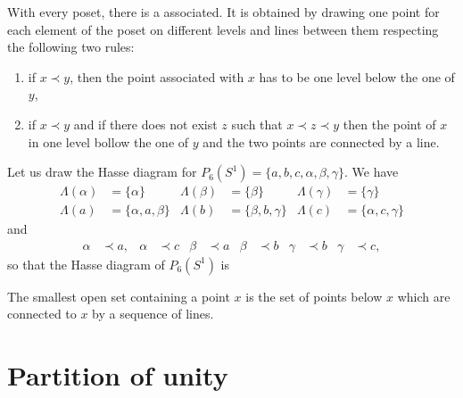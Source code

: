 With every poset, there is a  associated. It is obtained by drawing one point for each element of the poset on different levels and lines between them respecting the following two rules:
\begin{enumerate}
	\item if $x\prec y$, then the point associated with $x$ has to be one level below the one of $y$,
	\item if $x\prec y$ and if there does not exist $z$ such that $x\prec z\prec y$ then the point of $x$ in one level bollow the one of $y$ and the two points are connected by a line.
\end{enumerate}
Let us draw the Hasse diagram for $P_6(S^1)=\{ a,b,c,\alpha,\beta,\gamma \}$. We have
\begin{align*}
	\Lambda(\alpha) & =\{ \alpha \}         & \Lambda(\beta) & =\{ \beta \}          & \Lambda(\gamma) & =\{ \gamma \}          \\
	\Lambda(a)      & =\{ \alpha,a,\beta \} & \Lambda(b)     & =\{ \beta,b,\gamma \} & \Lambda(c)      & =\{ \alpha,c,\gamma \}
\end{align*}
and
\begin{align*}
	\alpha & \prec a, & \alpha & \prec c & \beta & \prec a & \beta & \prec b & \gamma & \prec b & \gamma & \prec c,
\end{align*}
so that the Hasse diagram of $P_6(S^1)$ is
\begin{center}
	
\end{center}
The smallest open set containing a point $x$ is the set of points below $x$ which are connected to $x$ by a sequence of lines.


\section{Partition of unity}

